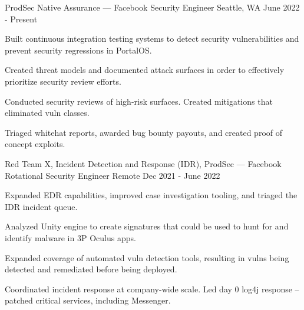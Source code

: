
\begin{cventries}

\cventry
{ProdSec Native Assurance — Facebook} %
{Security Engineer} %
{Seattle, WA} %
{June 2022 - Present} %
{
	\begin{cvitems} %
		\item {Built continuous integration testing systems to detect security vulnerabilities and prevent security regressions in PortalOS.}
		\item {Created threat models and documented attack surfaces in order to effectively prioritize security review efforts.}
		\item {Conducted security reviews of high-risk surfaces. Created  mitigations that eliminated vuln classes.}
		\item {Triaged whitehat reports,  awarded bug bounty payouts, and created proof of concept exploits.}
	\end{cvitems}
}
\cventry
{Red Team X, Incident Detection and Response (IDR), ProdSec — Facebook} %
{Rotational Security Engineer} %
{Remote} %
{Dec 2021 - June 2022} %
{
	\begin{cvitems} %
		\item {Expanded EDR capabilities, improved case investigation tooling, and triaged the IDR incident queue.}
		\item {Analyzed Unity engine to create signatures that could be used to hunt for and identify malware in 3P Oculus apps.}
		\item {Expanded coverage of automated vuln detection tools, resulting in vulns being detected and remediated before being deployed.}
		\item {Coordinated incident response at company-wide scale. Led day 0 log4j response -- patched critical services, including Messenger.}

\end{cvitems}}
\end{cventries}
